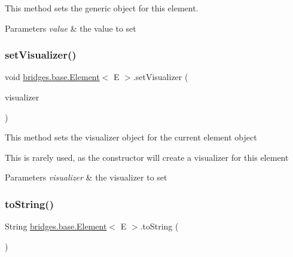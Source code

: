 This method sets the generic object for this element.


\begin{DoxyParams}{Parameters}
{\em value} & the value to set \\
\hline
\end{DoxyParams}
\mbox{\label{classbridges_1_1base_1_1_element_a5befa95788099f1bc72cdf5361c55bed}} 
\subsubsection{\texorpdfstring{set\+Visualizer()}{setVisualizer()}}
{\footnotesize\ttfamily void \hyperlink{classbridges_1_1base_1_1_element}{bridges.\+base.\+Element}$<$ E $>$.set\+Visualizer (\begin{DoxyParamCaption}\item[{\hyperlink{classbridges_1_1base_1_1_element_visualizer}{Element\+Visualizer}}]{visualizer }\end{DoxyParamCaption})}

This method sets the visualizer object for the current element object

This is rarely used, as the constructor will create a visualizer for this element


\begin{DoxyParams}{Parameters}
{\em visualizer} & the visualizer to set \\
\hline
\end{DoxyParams}
\mbox{\label{classbridges_1_1base_1_1_element_a7dc685e317fd9dc2e73e049a9f907e42}} 
\subsubsection{\texorpdfstring{to\+String()}{toString()}}
{\footnotesize\ttfamily String \hyperlink{classbridges_1_1base_1_1_element}{bridges.\+base.\+Element}$<$ E $>$.to\+String (\begin{DoxyParamCaption}{ }\end{DoxyParamCaption})}

